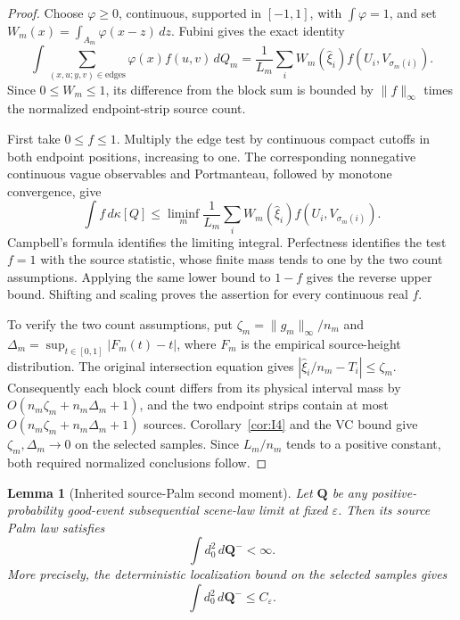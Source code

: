 \documentclass[11pt,reqno]{amsart}
\newtheorem{lemma}[theorem]{Lemma}
\theoremstyle{definition}
\theoremstyle{remark}
\numberwithin{equation}{section}
\begin{document}
\begin{proof}
Choose \(\varphi\ge0\), continuous, supported in \([-1,1]\), with
\(\int\varphi=1\), and set
\(W_m(x)=\int_{A_m}\varphi(x-z)\,dz\).
Fubini gives the exact identity
\[
\int\sum_{(x,u;y,v)\in\mathrm{edges}}
 \varphi(x)f(u,v)\,dQ_m
 =\frac1{L_m}\sum_i W_m(\widehat\xi_i)f(U_i,V_{\sigma_m(i)}).
\]
Since \(0\le W_m\le1\), its difference from the block sum is bounded
by \(\|f\|_\infty\) times the normalized endpoint-strip source count.

First take \(0\le f\le1\).  Multiply the edge test by continuous
compact cutoffs in both endpoint positions, increasing to one.
The corresponding nonnegative continuous vague observables and
Portmanteau, followed by monotone convergence, give
\[
\int f\,d\kappa[Q]\le
\liminf_m\frac1{L_m}\sum_i W_m(\widehat\xi_i)f(U_i,V_{\sigma_m(i)}).
\]
Campbell's formula identifies the limiting integral.  Perfectness
identifies the test \(f=1\) with the source statistic, whose finite
mass tends to one by the two count assumptions.  Applying the same
lower bound to \(1-f\) gives the reverse upper bound.  Shifting and
scaling proves the assertion for every continuous real \(f\).

To verify the two count assumptions, put
\(\zeta_m=\|g_m\|_\infty/n_m\) and
\(\Delta_m=\sup_{t\in[0,1]}|F_m(t)-t|\), where \(F_m\) is the
empirical source-height distribution.  The original intersection
equation gives \(|\widehat\xi_i/n_m-T_i|\le\zeta_m\).
Consequently each block count differs from its physical interval mass
by \(O(n_m\zeta_m+n_m\Delta_m+1)\), and the two endpoint strips
contain at most \(O(n_m\zeta_m+n_m\Delta_m+1)\) sources.
Corollary~\ref{cor:I4} and the VC bound give \(\zeta_m,\Delta_m\to0\) on the selected
samples.  Since \(L_m/n_m\) tends to a positive constant, both
required normalized conclusions follow.
\end{proof}

\begin{lemma}[Inherited source-Palm second moment]
\label{lem:palm-l2}
Let \(\mathbf Q\) be any positive-probability good-event subsequential
scene-law limit at fixed \(\varepsilon\).  Then its source Palm law satisfies
\begin{equation}
\boxed{\int d_0^2\,d\mathbf Q^-<\infty.}
\label{eq:4.12}
\end{equation}
More precisely, the deterministic localization bound on the selected samples gives
\begin{equation}
\int d_0^2\,d\mathbf Q^-\le C_\varepsilon.
\label{eq:4.13}
\end{equation}
\end{lemma}
\end{document}

